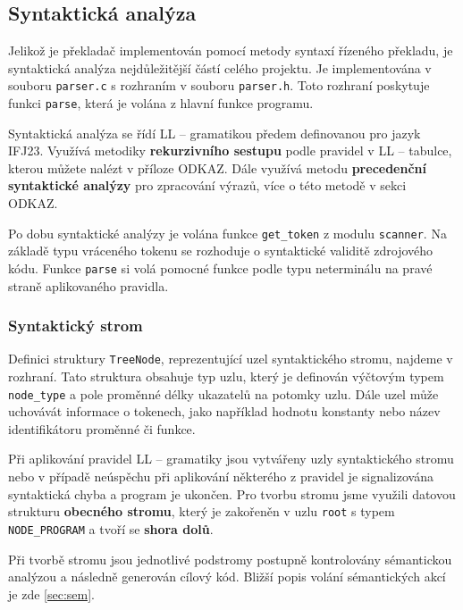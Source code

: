 \documentclass[a4paper, 11pt]{article}
\begin{document}
	\subsection{Syntaktická analýza}
	Jelikož je překladač implementován pomocí metody syntaxí řízeného překladu, je syntaktická analýza nej\-důležitější částí celého projektu.
	Je implementována v souboru \texttt{parser.c} s rozhraním v souboru \texttt{parser.h}. Toto rozhraní poskytuje funkci \texttt{parse}, která je volána z hlavní funkce programu.
	\par\noindent Syntaktická analýza se řídí LL -- gramatikou předem definovanou pro jazyk IFJ23. Využívá metodiky \textbf{rekurzivního sestupu} podle pravidel v LL -- tabulce, kterou můžete nalézt v příloze ODKAZ.
	Dále využívá metodu \textbf{precedenční syntaktické analýzy} pro zpracování výrazů, více o této metodě v sekci ODKAZ.
	\par\noindent Po dobu syntaktické analýzy je volána funkce \texttt{get\_token} z modulu \texttt{scanner}. Na základě typu vráceného tokenu se rozhoduje o syntaktické validitě zdrojového kódu. Funkce \texttt{parse} si volá pomocné funkce podle typu neterminálu na pravé straně aplikovaného pravidla.

	\subsubsection{Syntaktický strom}
	Definici struktury \texttt{TreeNode}, reprezentující uzel syntaktického stromu, najdeme v rozhraní. Tato struktura obsahuje typ uzlu, který je definován výčtovým typem \texttt{node\_type} a pole proměnné délky ukazatelů na potomky uzlu. 
	Dále uzel může uchovávát informace o tokenech, jako například hodnotu konstanty nebo název identifikátoru proměnné či funkce.
	\par\noindent Při aplikování pravidel LL -- gramatiky jsou vytvářeny uzly syntaktického stromu nebo v případě neúspěchu při aplikování některého z pravidel je signalizována syntaktická chyba a program je ukončen.
	Pro tvorbu stromu jsme využili datovou strukturu \textbf{obecného stromu}, který je zakořeněn v uzlu \texttt{root} s typem \texttt{NODE\_PROGRAM} a tvoří se \textbf{shora dolů}.
	\par\noindent Při tvorbě stromu jsou jednotlivé podstromy postupně kontrolovány sémantickou analýzou a následně generován cílový kód. Bližší popis volání sémantic\-kých akcí je zde \ref{sec:sem}.
\end{document}
